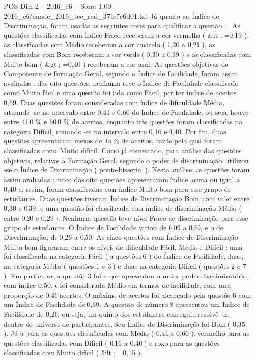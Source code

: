 \begin{textsample}{POS Dim 2 – 2016\_c6 – Score 1.00 – 2016\_c6/enade\_2016\_tec\_rad\_371c7e6d01.txt}
Já quanto ao Índice de Discriminação, foram usadas as seguintes cores para qualificar a questão :  As questões classificadas com índice Fraco receberam a cor vermelho ( \&lt ; =0,19 ), as classificadas com Médio receberam a cor amarelo ( 0,20 a 0,29 ), as classificadas com Bom receberam a cor verde ( 0,30 a 0,39 ) e as classificadas com Muito bom ( \&gt ; =0,40 ) receberam a cor azul.
As questões objetivas do Componente de Formação Geral, segundo o Índice de Facilidade, foram assim avaliadas : das oito questões, nenhuma teve o Índice de Facilidade classificado como Muito fácil e uma questão foi tida como Fácil, por ter índice de acertos 0,69.
Duas questões foram consideradas com índice de dificuldade Médio, situando -se no intervalo entre 0,41 e 0,60 do Índice de Facilidade, ou seja, houve entre 41,0 \% e 60,0 \% de acertos, enquanto três questões foram classificadas na categoria Difícil, situando -se no intervalo entre 0,16 e 0,40.
Por fim, duas questões apresentaram menos de 15 \% de acertos, razão pela qual foram classificadas como Muito difícil.
Como já comentado, para análise das questões objetivas, relativas à Formação Geral, segundo o poder de discriminação, utilizou -se o Índice de Discriminação ( ponto-bisserial ).
Nesta análise, as questões foram assim avaliadas : cinco das oito questões apresentaram índice acima ou igual a 0,40 e, assim, foram classificadas com índice Muito bom para esse grupo de estudantes.
Duas questões tiveram Índice de Discriminação Bom, com valor entre 0,30 e 0,39, e uma questão foi classificada com índice de discriminação Médio ( entre 0,20 e 0,29 ).
Nenhuma questão teve nível Fraco de discriminação para esse grupo de estudantes.
O Índice de Facilidade variou de 0,09 a 0,69, e o de Discriminação, de 0,26 a 0,50.
As cinco questões com Índice de Discriminação Muito bom figuraram entre os níveis de dificuldade Fácil, Médio e Difícil : uma foi classificada na categoria Fácil ( a questões 6 ) do Índice de Facilidade, duas, na categoria Médio ( questões 1 e 3 ) e duas na categoria Difícil ( questões 2 e 7 ).
Em particular, a questão 3 foi a que apresentou o maior poder discriminatório, com índice 0,50, e foi considerada Médio em termos de facilidade, com uma proporção de 0,46 acertos.
O máximo de acertos foi alcançado pela questão 6 com um Índice de Facilidade de 0,69.
A questão de número 8 apresentou um Índice de Facilidade de 0,20, ou seja, um quinto dos estudantes conseguiu resolvê -la, dentro do universo de participantes.
Seu Índice de Discriminação foi Bom ( 0,35 ).
Já a para as questões classificadas com Médio ( 0,41 a 0,60 ), vermelho para as questões classificadas com Difícil ( 0,16 a 0,40 ) e roxo para as questões classificadas com Muito difícil ( \&lt ; =0,15 ).

\end{textsample}
